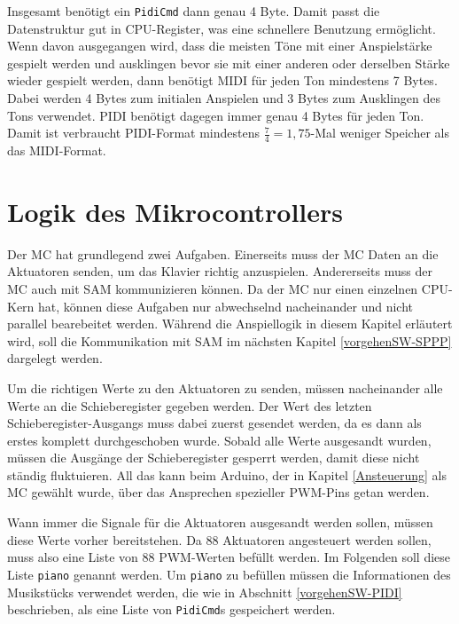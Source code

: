 Insgesamt benötigt ein \lstinline{PidiCmd} dann genau 4 Byte.
Damit passt die Datenstruktur gut in CPU-Register, was eine schnellere Benutzung ermöglicht.
Wenn davon ausgegangen wird, dass die meisten Töne mit einer Anspielstärke gespielt werden und ausklingen bevor sie mit einer anderen oder derselben Stärke wieder gespielt werden, dann benötigt \ac{MIDI} für jeden Ton mindestens 7 Bytes.
Dabei werden 4 Bytes zum initialen Anspielen und 3 Bytes zum Ausklingen des Tons verwendet.
\ac{PIDI} benötigt dagegen immer genau 4 Bytes für jeden Ton.
Damit ist verbraucht \ac{PIDI}-Format mindestens $\frac{7}{4} = 1,75$-Mal weniger Speicher als das \ac{MIDI}-Format.


\section{Logik des Mikrocontrollers} \label{vorgehenSW-MC}

Der \ac{MC} hat grundlegend zwei Aufgaben.
Einerseits muss der \ac{MC} Daten an die Aktuatoren senden, um das Klavier richtig anzuspielen.
Andererseits muss der \ac{MC} auch mit \ac{SAM} kommunizieren können.
Da der \ac{MC} nur einen einzelnen CPU-Kern hat, können diese Aufgaben nur abwechselnd nacheinander und nicht parallel bearebeitet werden.
Während die Anspiellogik in diesem Kapitel erläutert wird, soll die Kommunikation mit \ac{SAM} im nächsten Kapitel \ref{vorgehenSW-SPPP} dargelegt werden.

Um die richtigen Werte zu den Aktuatoren zu senden, müssen nacheinander alle Werte an die Schieberegister gegeben werden.
Der Wert des letzten Schieberegister-Ausgangs muss dabei zuerst gesendet werden, da es dann als erstes komplett durchgeschoben wurde.
Sobald alle Werte ausgesandt wurden, müssen die Ausgänge der Schieberegister gesperrt werden, damit diese nicht ständig fluktuieren.
All das kann beim Arduino, der in Kapitel \ref{Ansteuerung} als \ac{MC} gewählt wurde, über das Ansprechen spezieller \ac{PWM}-Pins getan werden.

Wann immer die Signale für die Aktuatoren ausgesandt werden sollen, müssen diese Werte vorher bereitstehen.
Da 88 Aktuatoren angesteuert werden sollen, muss also eine Liste von 88 \ac{PWM}-Werten befüllt werden.
Im Folgenden soll diese Liste \lstinline{piano} genannt werden.
Um \lstinline{piano} zu befüllen müssen die Informationen des Musikstücks verwendet werden, die wie in Abschnitt \ref{vorgehenSW-PIDI} beschrieben, als eine Liste von \lstinline{PidiCmd}s gespeichert werden.

